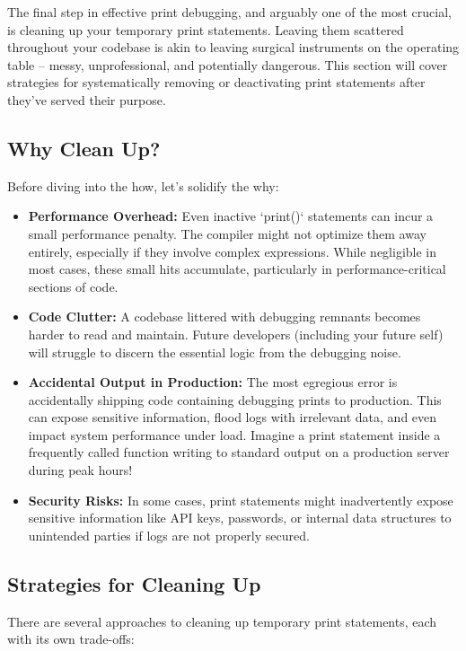 \documentclass{article}
\begin{document}
{{{The final step in effective print debugging, and arguably one of the most crucial, is cleaning up your temporary print statements. Leaving them scattered throughout your codebase is akin to leaving surgical instruments on the operating table – messy, unprofessional, and potentially dangerous.  This section will cover strategies for systematically removing or deactivating print statements after they've served their purpose.

\subsection*{Why Clean Up?}

Before diving into the how, let's solidify the why:

\begin{itemize}
    \item \textbf{Performance Overhead:}  Even inactive `print()` statements can incur a small performance penalty. The compiler might not optimize them away entirely, especially if they involve complex expressions. While negligible in most cases, these small hits accumulate, particularly in performance-critical sections of code.
    \item \textbf{Code Clutter:} A codebase littered with debugging remnants becomes harder to read and maintain.  Future developers (including your future self) will struggle to discern the essential logic from the debugging noise.
    \item \textbf{Accidental Output in Production:}  The most egregious error is accidentally shipping code containing debugging prints to production. This can expose sensitive information, flood logs with irrelevant data, and even impact system performance under load. Imagine a print statement inside a frequently called function writing to standard output on a production server during peak hours!
    \item \textbf{Security Risks:} In some cases, print statements might inadvertently expose sensitive information like API keys, passwords, or internal data structures to unintended parties if logs are not properly secured.
\end{itemize}

\subsection*{Strategies for Cleaning Up}

There are several approaches to cleaning up temporary print statements, each with its own trade-offs:

}}}
\end{document}
